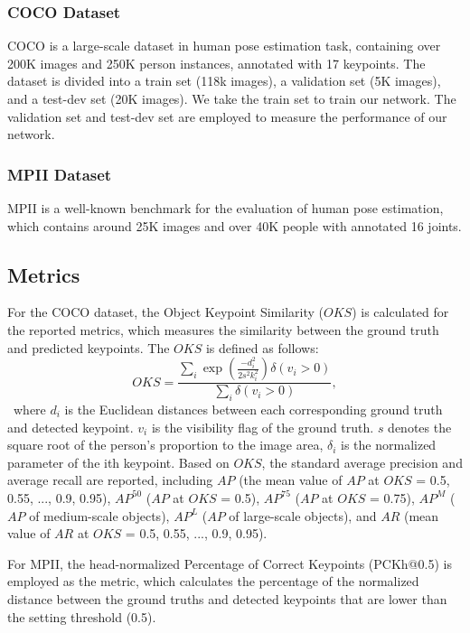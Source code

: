 \documentclass[runningheads]{llncs}
\begin{document}
\subsubsection{COCO Dataset}
COCO is a large-scale dataset in human pose estimation task, containing over 200K images and 250K person instances, annotated with 17 keypoints. The dataset is divided into a train set (118k images), a validation set (5K images), and a test-dev set (20K images). We take the train set to train our network. The validation set and test-dev set are employed to measure the performance of our network.

\subsubsection{MPII Dataset} 
MPII is a well-known benchmark for the evaluation of human pose estimation, which contains around 25K images and over 40K people with annotated 16 joints.

\subsection{Metrics}
For the COCO dataset, the Object Keypoint Similarity ($OKS$) is calculated for the reported metrics, which measures the similarity between the ground truth and predicted keypoints. The $OKS$ is defined as follows:
\begin{equation}
    OKS = \frac{{\sum\nolimits_i {\exp (\frac{{ - d_i^2}}{{2{s^2}k_i^2}})\delta ({v_i} > 0)} }}{{\sum\nolimits_i {\delta ({v_i} > 0)} }},
\end{equation}\
where $d_i$ is the Euclidean distances between each corresponding ground truth and detected keypoint. $v_i$ is the visibility flag of the ground truth. $s$ denotes the square root of the person's proportion to the image area, $\delta_{i}$ is the normalized parameter of the ith keypoint. Based on $OKS$, the standard average precision and average recall are reported, including $AP$ (the mean value of $AP$ at $OKS$ = 0.5, 0.55, ..., 0.9, 0.95), $AP^{50}$ ($AP$ at $OKS$ = 0.5), $AP^{75}$ ($AP$ at $OKS$ = 0.75), $AP^{M}$ ($AP$ of medium-scale objects), $AP^{L}$ ($AP$ of large-scale objects), and $AR$ (mean value of $AR$ at $OKS$ = 0.5, 0.55, ..., 0.9, 0.95).

For MPII, the head-normalized Percentage of Correct Keypoints (PCKh@0.5) \cite{MPII20142d} is employed as the metric, which calculates the percentage of the normalized distance between the ground truths and detected keypoints that are lower than the setting threshold (0.5).
\end{document}
